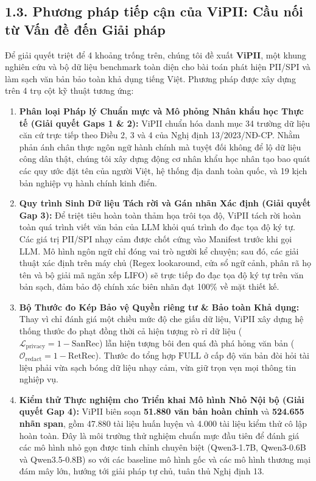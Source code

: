 \documentclass[
  11pt,
  a4paper,
]{article}
\providecommand{\tightlist}{%
  \setlength{\itemsep}{0pt}\setlength{\parskip}{0pt}}
\begin{document}
\subsection{1.3. Phương pháp tiếp cận của ViPII: Cầu nối từ Vấn đề đến Giải
pháp}\label{phux1b0ux1a1ng-phuxe1p-tiux1ebfp-cux1eadn-cux1ee7a-vipii-cux1ea7u-nux1ed1i-tux1eeb-vux1ea5n-ux111ux1ec1-ux111ux1ebfn-giux1ea3i-phuxe1p}

Để giải quyết triệt để 4 khoảng trống trên, chúng tôi đề xuất \textbf{ViPII}, một khung nghiên cứu
và bộ dữ liệu benchmark toàn diện cho bài toán phát hiện PII/SPI và làm sạch văn bản bảo toàn khả
dụng tiếng Việt. Phương pháp được xây dựng trên 4 trụ cột kỹ thuật tương ứng:

\begin{enumerate}
\def\labelenumi{\arabic{enumi}.}
\tightlist
\item
  \textbf{Phân loại Pháp lý Chuẩn mực và Mô phỏng Nhân khẩu học Thực tế (Giải quyết Gaps 1 \& 2):}
  ViPII chuẩn hóa danh mục 34 trường dữ liệu căn cứ trực tiếp theo Điều 2, 3 và 4 của Nghị định
  13/2023/NĐ-CP. Nhằm phản ánh chân thực ngôn ngữ hành chính mà tuyệt đối không để lộ dữ liệu công
  dân thật, chúng tôi xây dựng động cơ nhân khẩu học nhân tạo bao quát các quy ước đặt tên của người
  Việt, hệ thống địa danh toàn quốc, và 19 kịch bản nghiệp vụ hành chính kinh điển.
\item
  \textbf{Quy trình Sinh Dữ liệu Tách rời và Gán nhãn Xác định (Giải quyết Gap 3):} Để triệt tiêu
  hoàn toàn thảm họa trôi tọa độ, ViPII tách rời hoàn toàn quá trình viết văn bản của LLM khỏi quá
  trình đo đạc tọa độ ký tự. Các giá trị PII/SPI nhạy cảm được chốt cứng vào Manifest trước khi gọi
  LLM. Mô hình ngôn ngữ chỉ đóng vai trò người kể chuyện; sau đó, các giải thuật xác định trên máy
  chủ (Regex lookaround, cửa sổ ngữ cảnh, phân rã họ tên và bộ giải mã ngăn xếp LIFO) sẽ trực tiếp
  đo đạc tọa độ ký tự trên văn bản sạch, đảm bảo độ chính xác biên nhãn đạt 100\% về mặt thiết kế.
\item
  \textbf{Bộ Thước đo Kép Bảo vệ Quyền riêng tư \& Bảo toàn Khả dụng:} Thay vì chỉ đánh giá một
  chiều mức độ che giấu dữ liệu, ViPII xây dựng hệ thống thước đo phạt đồng thời cả hiện tượng rò rỉ
  dữ liệu (\(\mathcal{L}_{\text{privacy}} = 1 - \text{SanRec}\)) lẫn hiện tượng bôi đen quá đà phá
  hỏng văn bản (\(\mathcal{O}_{\text{redact}} = 1 - \text{RetRec}\)). Thước đo tổng hợp
  \(\text{FULL}\) ở cấp độ văn bản đòi hỏi tài liệu phải vừa sạch bóng dữ liệu nhạy cảm, vừa giữ
  trọn vẹn mọi thông tin nghiệp vụ.
\item
  \textbf{Kiểm thử Thực nghiệm cho Triển khai Mô hình Nhỏ Nội bộ (Giải quyết Gap 4):} ViPII biên
  soạn \textbf{51.880 văn bản hoàn chỉnh} và \textbf{524.655 nhãn span}, gồm 47.880 tài liệu huấn
  luyện và 4.000 tài liệu kiểm thử cô lập hoàn toàn. Đây là môi trường thử nghiệm chuẩn mực đầu tiên
  để đánh giá các mô hình nhỏ gọn được tinh chỉnh chuyên biệt (Qwen3-1.7B, Qwen3-0.6B và
  Qwen3.5-0.8B) so với các baseline mô hình gốc và các mô hình thương mại đám mây lớn, hướng tới
  giải pháp tự chủ, tuân thủ Nghị định 13.
\end{enumerate}
\end{document}
